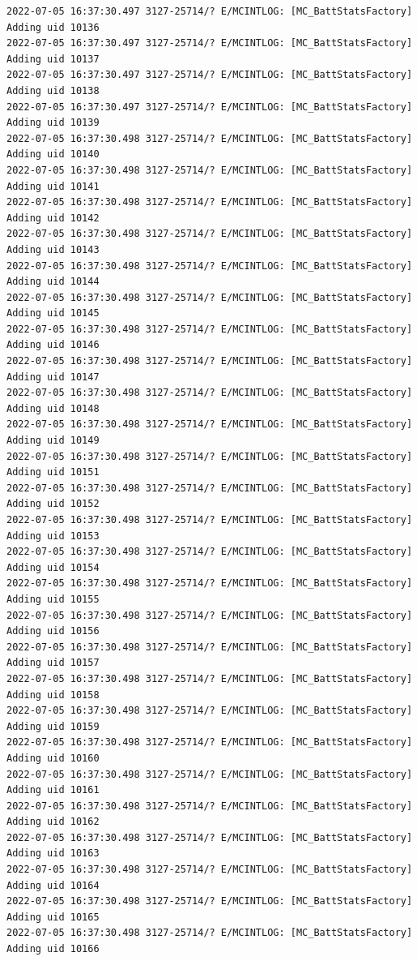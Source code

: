 \documentclass[a4paper,12pt]{book}
\begin{document}
\begin{lstlisting}
2022-07-05 16:37:30.497 3127-25714/? E/MCINTLOG: [MC_BattStatsFactory] Adding uid 10136
2022-07-05 16:37:30.497 3127-25714/? E/MCINTLOG: [MC_BattStatsFactory] Adding uid 10137
2022-07-05 16:37:30.497 3127-25714/? E/MCINTLOG: [MC_BattStatsFactory] Adding uid 10138
2022-07-05 16:37:30.497 3127-25714/? E/MCINTLOG: [MC_BattStatsFactory] Adding uid 10139
2022-07-05 16:37:30.498 3127-25714/? E/MCINTLOG: [MC_BattStatsFactory] Adding uid 10140
2022-07-05 16:37:30.498 3127-25714/? E/MCINTLOG: [MC_BattStatsFactory] Adding uid 10141
2022-07-05 16:37:30.498 3127-25714/? E/MCINTLOG: [MC_BattStatsFactory] Adding uid 10142
2022-07-05 16:37:30.498 3127-25714/? E/MCINTLOG: [MC_BattStatsFactory] Adding uid 10143
2022-07-05 16:37:30.498 3127-25714/? E/MCINTLOG: [MC_BattStatsFactory] Adding uid 10144
2022-07-05 16:37:30.498 3127-25714/? E/MCINTLOG: [MC_BattStatsFactory] Adding uid 10145
2022-07-05 16:37:30.498 3127-25714/? E/MCINTLOG: [MC_BattStatsFactory] Adding uid 10146
2022-07-05 16:37:30.498 3127-25714/? E/MCINTLOG: [MC_BattStatsFactory] Adding uid 10147
2022-07-05 16:37:30.498 3127-25714/? E/MCINTLOG: [MC_BattStatsFactory] Adding uid 10148
2022-07-05 16:37:30.498 3127-25714/? E/MCINTLOG: [MC_BattStatsFactory] Adding uid 10149
2022-07-05 16:37:30.498 3127-25714/? E/MCINTLOG: [MC_BattStatsFactory] Adding uid 10151
2022-07-05 16:37:30.498 3127-25714/? E/MCINTLOG: [MC_BattStatsFactory] Adding uid 10152
2022-07-05 16:37:30.498 3127-25714/? E/MCINTLOG: [MC_BattStatsFactory] Adding uid 10153
2022-07-05 16:37:30.498 3127-25714/? E/MCINTLOG: [MC_BattStatsFactory] Adding uid 10154
2022-07-05 16:37:30.498 3127-25714/? E/MCINTLOG: [MC_BattStatsFactory] Adding uid 10155
2022-07-05 16:37:30.498 3127-25714/? E/MCINTLOG: [MC_BattStatsFactory] Adding uid 10156
2022-07-05 16:37:30.498 3127-25714/? E/MCINTLOG: [MC_BattStatsFactory] Adding uid 10157
2022-07-05 16:37:30.498 3127-25714/? E/MCINTLOG: [MC_BattStatsFactory] Adding uid 10158
2022-07-05 16:37:30.498 3127-25714/? E/MCINTLOG: [MC_BattStatsFactory] Adding uid 10159
2022-07-05 16:37:30.498 3127-25714/? E/MCINTLOG: [MC_BattStatsFactory] Adding uid 10160
2022-07-05 16:37:30.498 3127-25714/? E/MCINTLOG: [MC_BattStatsFactory] Adding uid 10161
2022-07-05 16:37:30.498 3127-25714/? E/MCINTLOG: [MC_BattStatsFactory] Adding uid 10162
2022-07-05 16:37:30.498 3127-25714/? E/MCINTLOG: [MC_BattStatsFactory] Adding uid 10163
2022-07-05 16:37:30.498 3127-25714/? E/MCINTLOG: [MC_BattStatsFactory] Adding uid 10164
2022-07-05 16:37:30.498 3127-25714/? E/MCINTLOG: [MC_BattStatsFactory] Adding uid 10165
2022-07-05 16:37:30.498 3127-25714/? E/MCINTLOG: [MC_BattStatsFactory] Adding uid 10166

\end{lstlisting}
\end{document}
